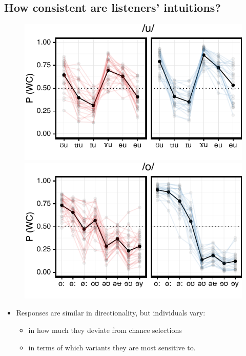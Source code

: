 \documentclass[a0,final]{a0poster}
\begin{document}
\begin{multicols}{4}
\subsection*{How consistent are listeners' intuitions?}
\begin{figure}[H]
\centering
\includegraphics[scale=1.95]{u_clust.pdf}
\includegraphics[scale=1.95]{o_clust.pdf}
\end{figure}
\vspace*{-1cm}
\begin{itemize}
\item{Responses are similar in directionality, but individuals vary:\begin{itemize}\item{in how much they deviate from chance selections} \item{in terms of which variants they are most sensitive to.}\end{itemize}}

\end{itemize}
\end{multicols}
\end{document}
